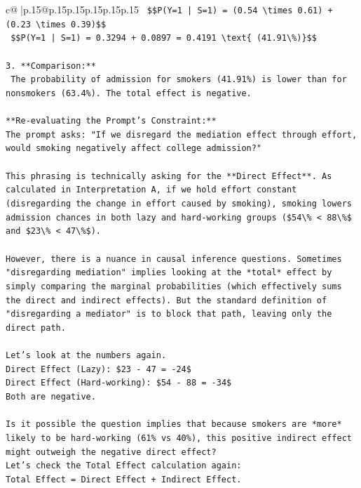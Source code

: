\documentclass{article}
\begin{document}
{\begin{supertabular}{c@{$\;$}|p{.15\linewidth}@{}p{.15\linewidth}p{.15\linewidth}p{.15\linewidth}p{.15\linewidth}p{.15\linewidth}}
{{{\texttt{    \$\$P(Y=1 | S=1) = (0.54 \textbackslash{}times 0.61) + (0.23 \textbackslash{}times 0.39)\$\$} \\
\texttt{    \$\$P(Y=1 | S=1) = 0.3294 + 0.0897 = 0.4191 \textbackslash{}text\{ (41.91\textbackslash{}\%)\}\$\$} \\
\\ 
\texttt{3.  **Comparison:**} \\
\texttt{    The probability of admission for smokers (41.91\%) is lower than for nonsmokers (63.4\%). The total effect is negative.} \\
\\ 
\texttt{**Re{-}evaluating the Prompt's Constraint:**} \\
\texttt{The prompt asks: "If we disregard the mediation effect through effort, would smoking negatively affect college admission?"} \\
\\ 
\texttt{This phrasing is technically asking for the **Direct Effect**. As calculated in Interpretation A, if we hold effort constant (disregarding the change in effort caused by smoking), smoking lowers admission chances in both lazy and hard{-}working groups (\$54\textbackslash{}\% < 88\textbackslash{}\%\$ and \$23\textbackslash{}\% < 47\textbackslash{}\%\$).} \\
\\ 
\texttt{However, there is a nuance in causal inference questions. Sometimes "disregarding mediation" implies looking at the *total* effect by simply comparing the marginal probabilities (which effectively sums the direct and indirect effects). But the standard definition of "disregarding a mediator" is to block that path, leaving only the direct path.} \\
\\ 
\texttt{Let's look at the numbers again.} \\
\texttt{Direct Effect (Lazy): \$23 {-} 47 = {-}24\$} \\
\texttt{Direct Effect (Hard{-}working): \$54 {-} 88 = {-}34\$} \\
\texttt{Both are negative.} \\
\\ 
\texttt{Is it possible the question implies that because smokers are *more* likely to be hard{-}working (61\% vs 40\%), this positive indirect effect might outweigh the negative direct effect?} \\
\texttt{Let's check the Total Effect calculation again:} \\
\texttt{Total Effect = Direct Effect + Indirect Effect.} \\
}}}
\end{supertabular}}
\end{document}
